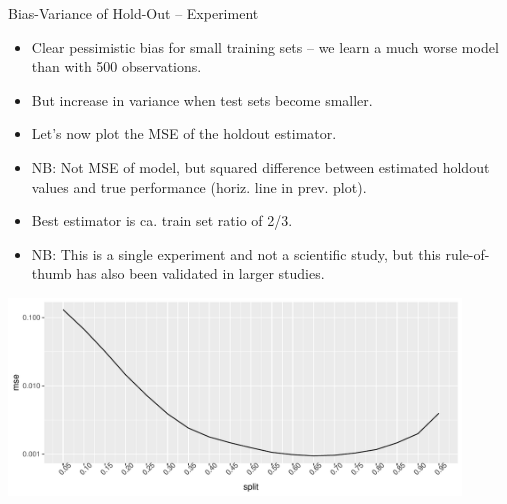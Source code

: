 \documentclass[11pt,compress,t,notes=noshow, xcolor=table]{beamer}
\begin{document}
\begin{vbframe}{Bias-Variance of Hold-Out -- Experiment}
\lz

\begin{itemize}
  \item Clear pessimistic bias for small training sets -- we learn
      a much worse model than with 500 observations. 
  \item But increase in variance when test sets become smaller.
\end{itemize}

\framebreak

\begin{itemize}
  \item Let's now plot the MSE of the holdout estimator.
  \item NB: Not MSE of model, but squared difference between estimated
      holdout values and true performance (horiz. line in 
  prev. plot).
  \item Best estimator is ca. train set ratio of 2/3.
  \item NB: This is a single experiment and not a scientific study, but this 
  rule-of-thumb has also been validated in larger studies.
\end{itemize}

\begin{center}
  \includegraphics[width=0.9\textwidth]{figure/test-holdout-example-2} 
\end{center}

\end{vbframe}


\endlecture
\end{document}
